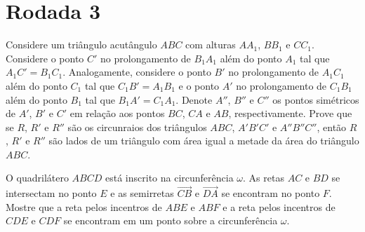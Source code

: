 \documentclass[10pt, a4paper]{article}
\begin{document}
	\section{Rodada 3}

	\begin{prob}[Bulgária 2013]
		Considere um triângulo acutângulo $ABC$ com alturas $AA_1$, $BB_1$ e $CC_1$. Considere o ponto $C'$ no prolongamento de $B_1A_1$ além do ponto $A_1$ tal que $A_1C' = B_1C_1$. Analogamente, considere o ponto $B'$ no prolongamento de $A_1C_1$ além do ponto $C_1$ tal que $C_1B' = A_1B_1$ e o ponto $A'$ no prolongamento de $C_1B_1$ além do ponto $B_1$ tal que $B_1A' = C_1A_1$. Denote $A''$, $B''$ e $C''$ os pontos simétricos de $A'$, $B'$ e $C'$ em relação aos pontos $BC$, $CA$ e $AB$, respectivamente. Prove que se $R$, $R'$ e $R''$ são os circunraios dos triângulos $ABC$, $A'B'C'$ e $A''B''C''$, então $R$, $R'$ e $R''$ são lados de um triângulo com área igual a metade da área do triângulo $ABC$.
	\end{prob}
	\begin{prob}[Bulgária 2014]
		O quadrilátero $ABCD$ está inscrito na circunferência $\omega$. As retas $AC$ e $BD$ se intersectam no ponto  $E$ e as semirretas $\overrightarrow{CB}$ e  $\overrightarrow{DA}$ se encontram no ponto $F$. Mostre que a reta pelos incentros de $ABE$ e $ABF$ e a reta pelos incentros de $CDE$ e $CDF$ se encontram em um ponto sobre a circunferência $\omega$.
	\end{prob}
\end{document}
